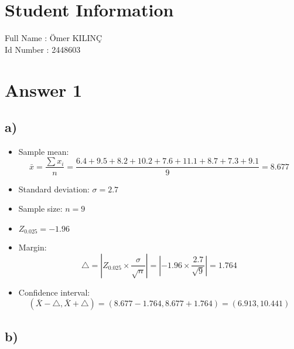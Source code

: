 \documentclass[12pt]{article}
\begin{document}
\section*{Student Information } 
Full Name : Ömer KILINÇ \\
Id Number :  2448603 \\

\section*{Answer 1}


\subsection*{a)} 


\begin{itemize}
    
    \item[] Sample mean:
    \[\bar{x} = \frac{\sum x_i}{n} = \frac{6.4 + 9.5 + 8.2 + 10.2 + 7.6 + 11.1 + 8.7 + 7.3 + 9.1}{9} = 8.677\]

    \item[] Standard deviation: \( \sigma = 2.7 \)

    \item[] Sample size: \( n = 9 \)

    \item[] \( Z_{0.025} = -1.96 \)

    \item[] Margin:
    \[    \bigtriangleup = | Z_{0.025} \times \frac{\sigma}{\sqrt{n}} | = | -1.96 \times \frac{2.7}{\sqrt{9}} | = 1.764 \]

    \item[] Confidence interval:
    \[\left( \bar{X} - \bigtriangleup, \bar{X} + \bigtriangleup \right) = (8.677 - 1.764, 8.677 + 1.764) = (6.913, 10.441)\]
    
\end{itemize}




\subsection*{b)} 
\end{document}
